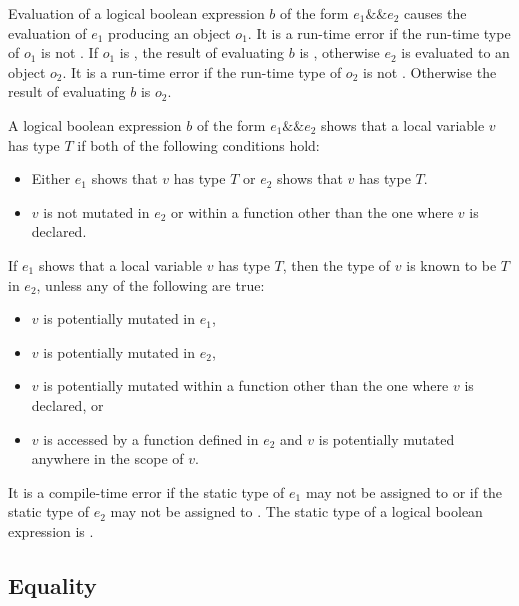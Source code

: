 \documentclass[makeidx]{article}
\begin{document}
\LMHash{}%
Evaluation of a logical boolean expression $b$ of the form $e_1 \&\& e_2$ causes the evaluation of $e_1$ producing an object $o_1$.
It is a run-time error if the run-time type of $o_1$ is not .
If $o_1$ is \FALSE, the result of evaluating $b$ is \FALSE, otherwise $e_2$ is evaluated to an object $o_2$.
It is a run-time error if the run-time type of $o_2$ is not .
Otherwise the result of evaluating $b$ is $o_2$.

\LMHash{}%
A logical boolean expression $b$ of the form $e_1 \&\& e_2$
shows that a local variable $v$ has type $T$
if both of the following conditions hold:
\begin{itemize}
\item Either $e_1$ shows that $v$ has type $T$ or $e_2$ shows that $v$ has type $T$.
\item $v$ is not mutated in $e_2$ or within a function other than the one where $v$ is declared.
\end{itemize}

\LMHash{}%
If $e_1$ shows that a local variable $v$ has type $T$,
then the type of $v$ is known to be $T$ in $e_2$,
unless any of the following are true:
\begin{itemize}
\item $v$ is potentially mutated in $e_1$,
\item $v$ is potentially mutated in $e_2$,
\item $v$ is potentially mutated within a function other
than the one where $v$ is declared, or
\item $v$ is accessed by a function defined in $e_2$ and
$v$ is potentially mutated anywhere in the scope of $v$.
\end{itemize}

\LMHash{}%
It is a compile-time error if the static type of $e_1$ may not be assigned to  or if the static type of $e_2$ may not be assigned to .
The static type of a logical boolean expression is .


\subsection{Equality}
\end{document}
